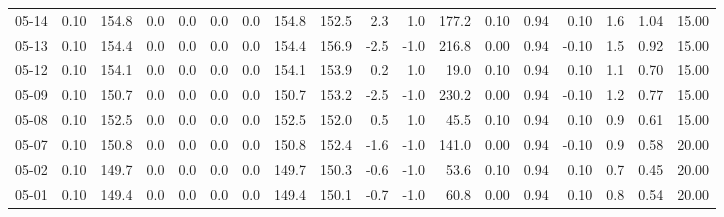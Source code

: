 \begin{threeparttable}
{\begin{tabular}{lrrrrrrrrrrrrrrrrr}
  05-14 &     0.10 & 154.8 &               0.0 &               0.0 &                0.0 &                0.0 & 154.8 & 152.5 &        2.3 &                      1.0 &               177.2 &       0.10 &      0.94 &           0.10 &              1.6 &            1.04 &                  15.00 \\
  05-13 &     0.10 & 154.4 &               0.0 &               0.0 &                0.0 &                0.0 & 154.4 & 156.9 &       -2.5 &                     -1.0 &               216.8 &       0.00 &      0.94 &          -0.10 &              1.5 &            0.92 &                  15.00 \\
  05-12 &     0.10 & 154.1 &               0.0 &               0.0 &                0.0 &                0.0 & 154.1 & 153.9 &        0.2 &                      1.0 &                19.0 &       0.10 &      0.94 &           0.10 &              1.1 &            0.70 &                  15.00 \\
  05-09 &     0.10 & 150.7 &               0.0 &               0.0 &                0.0 &                0.0 & 150.7 & 153.2 &       -2.5 &                     -1.0 &               230.2 &       0.00 &      0.94 &          -0.10 &              1.2 &            0.77 &                  15.00 \\
  05-08 &     0.10 & 152.5 &               0.0 &               0.0 &                0.0 &                0.0 & 152.5 & 152.0 &        0.5 &                      1.0 &                45.5 &       0.10 &      0.94 &           0.10 &              0.9 &            0.61 &                  15.00 \\
  05-07 &     0.10 & 150.8 &               0.0 &               0.0 &                0.0 &                0.0 & 150.8 & 152.4 &       -1.6 &                     -1.0 &               141.0 &       0.00 &      0.94 &          -0.10 &              0.9 &            0.58 &                  20.00 \\
  05-02 &     0.10 & 149.7 &               0.0 &               0.0 &                0.0 &                0.0 & 149.7 & 150.3 &       -0.6 &                     -1.0 &                53.6 &       0.10 &      0.94 &           0.10 &              0.7 &            0.45 &                  20.00 \\
  05-01 &     0.10 & 149.4 &               0.0 &               0.0 &                0.0 &                0.0 & 149.4 & 150.1 &       -0.7 &                     -1.0 &                60.8 &       0.00 &      0.94 &           0.10 &              0.8 &            0.54 &                  20.00 \\

\end{tabular}}
\end{threeparttable}
